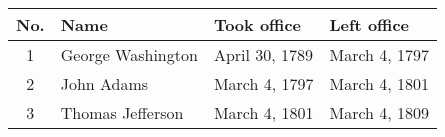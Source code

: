 \begin{tabular}{c|lll}
	No. & Name & Took office & Left office\\
	\hline
	1 & George Washington & April 30, 1789 & March 4, 1797\\
	\cline{1-1}
	2 & John Adams & March 4, 1797 & March 4, 1801\\
	\cline{1-1}
	3 & Thomas Jefferson & March 4, 1801 & March 4, 1809\\
\end{tabular}
